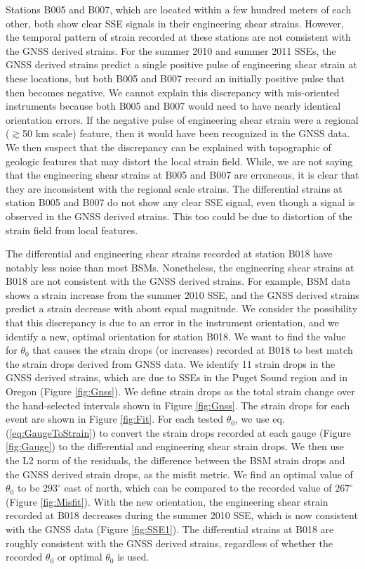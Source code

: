 \documentclass[10pt,a4paper]{article}
\begin{document}
Stations B005 and B007, which are located within a few hundred meters of each other, both show clear SSE signals in their engineering shear strains.  However, the temporal pattern of strain recorded at these stations are not consistent with the GNSS derived strains.  For the summer 2010 and summer 2011 SSEs, the GNSS derived strains predict a single positive pulse of engineering shear strain at these locations, but both B005 and B007 record an initially positive pulse that then becomes negative. We cannot explain this discrepancy with mis-oriented instruments because both B005 and B007 would need to have nearly identical orientation errors. If the negative pulse of engineering shear strain were a regional ($\gtrsim$50 km scale) feature, then it would have been recognized in the GNSS data. We then suspect that the discrepancy can be explained with topographic of geologic features that may distort the local strain field. While, we are not saying that the engineering shear strains at B005 and B007 are erroneous, it is clear that they are inconsistent with the regional scale strains. The differential strains at station B005 and B007 do not show any clear SSE signal, even though a signal is observed in the GNSS derived strains. This too could be due to distortion of the strain field from local features.

The differential and engineering shear strains recorded at station B018 have notably less noise than most BSMs. Nonetheless, the engineering shear strains at B018 are not consistent with the GNSS derived strains. For example, BSM data shows a strain increase from the summer 2010 SSE, and the GNSS derived strains predict a strain decrease with about equal magnitude. We consider the possibility that this discrepancy is due to an error in the instrument orientation, and we identify a new, optimal orientation for station B018. We want to find the value for $\theta_0$ that causes the strain drops (or increases) recorded at B018 to best match the strain drops derived from GNSS data. We identify 11 strain drops in the GNSS derived strains, which are due to SSEs in the Puget Sound region and in Oregon (Figure \ref{fig:Gnss}). We define strain drops as the total strain change over the hand-selected intervals shown in Figure \ref{fig:Gnss}. The strain drops for each event are shown in Figure \ref{fig:Fit}. For each tested $\theta_0$, we use eq. (\ref{eq:GaugeToStrain}) to convert the strain drops recorded at each gauge (Figure \ref{fig:Gauge}) to the differential and engineering shear strain drops. We then use the L2 norm of the residuals, the difference between the BSM strain drops and the GNSS derived strain drops, as the misfit metric. We find an optimal value of $\theta_0$  to be $293^\circ$ east of north, which can be compared to the recorded value of $267^\circ$ (Figure \ref{fig:Misfit}). With the new orientation, the engineering shear strain recorded at B018 decreases during the summer 2010 SSE, which is now consistent with the GNSS data (Figure \ref{fig:SSE1}). The differential strains at B018 are roughly consistent with the GNSS derived strains, regardless of whether the recorded $\theta_0$ or optimal $\theta_0$ is used.    
\end{document}
